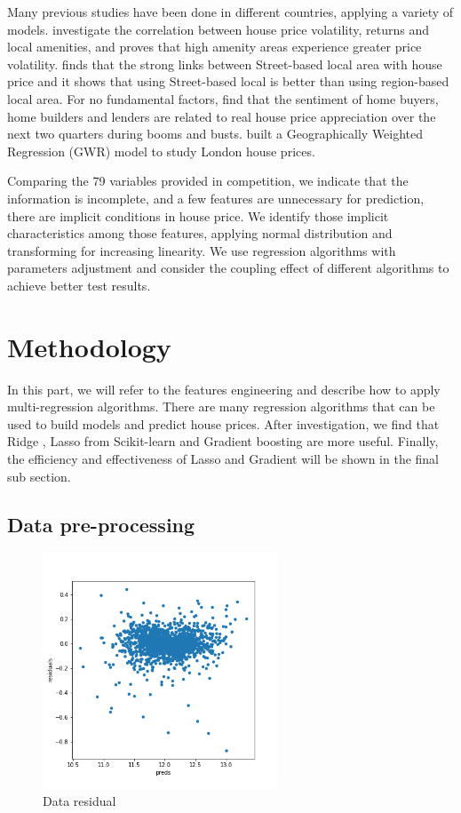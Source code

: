 \documentclass[11pt,a4paper]{article}
\begin{document}
Many previous studies have been done in different countries, applying a variety of models.  \citet{beracha2018relation} investigate the correlation between house price volatility, returns and local amenities, and proves that high amenity areas experience greater price volatility. \citet{law2017defining} finds that the strong links between Street-based local area with house price and it shows that using Street-based local is better than using region-based local area. For no fundamental factors, \citet{ling2015explaining} find that the sentiment of home buyers, home builders and lenders are related to real house price appreciation over the next two quarters during booms and busts. \citet{lu2014geographically} built a Geographically Weighted Regression (GWR) model to study London house prices.

Comparing the 79 variables provided in \citet{kaggle} competition, we indicate that the information is incomplete, and a few features are unnecessary for prediction, there are implicit conditions in house price. We identify those implicit characteristics among those features, applying normal distribution and transforming for increasing linearity. We use regression algorithms with parameters adjustment and consider the coupling effect of different algorithms to achieve better test results.

\section{Methodology}

In this part, we will refer to the features engineering and describe how to apply multi-regression algorithms. There are many regression algorithms that can be used to build models and predict house prices. After investigation, we find that Ridge \citep{rifkin2007notes}, Lasso \citep{friedman2010regularization} from Scikit-learn \citep{scikit-learn} and Gradient boosting \citep{chen2016xgboost} are more useful. Finally, the efficiency and effectiveness of Lasso and Gradient will be shown in the final sub section. 

\subsection{Data pre-processing}

\begin{figure}
    \centering
    \includegraphics[width=7cm]{images/residual.png}
    \caption{Data residual}
    \label{fig:residual}
\end{figure}
\end{document}
